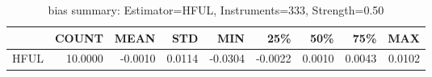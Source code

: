 \begin{table}[ht]
\centering
\caption{bias summary: Estimator=HFUL, Instruments=333, Strength=0.50}
\begin{tabular}{lrrrrrrrr}
\toprule
 & COUNT & MEAN & STD & MIN & 25\% & 50\% & 75\% & MAX \\
\midrule
HFUL & 10.0000 & -0.0010 & 0.0114 & -0.0304 & -0.0022 & 0.0010 & 0.0043 & 0.0102 \\
\bottomrule
\end{tabular}
\end{table}
